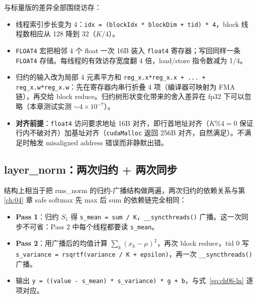 与标量版的差异全部围绕访存：
\begin{itemize}
  \item 线程索引步长变为 4：\texttt{idx = (blockIdx * blockDim + tid) * 4}，block 线程数相应从 128 降到 32（$K/4$）。
  \item \texttt{FLOAT4} 宏把相邻 4 个 float 一次 16B 装入 \texttt{float4} 寄存器；写回同样一条 \texttt{FLOAT4} 存储。每线程的有效访存宽度翻 4 倍，load/store 指令数减为 1/4。
  \item 归约的输入改为局部 4 元素平方和 \texttt{reg\_\allowbreak{}x.\allowbreak{}x*reg\_\allowbreak{}x.\allowbreak{}x + .\allowbreak{}.\allowbreak{}.\allowbreak{} + reg\_\allowbreak{}x.\allowbreak{}w*reg\_\allowbreak{}x.\allowbreak{}w}：先在寄存器内串行折叠 4 项（编译器可映射为 FMA 链），再交给 block reduce。归约树形状变化带来的舍入差异在 fp32 下可以忽略（本章测试实测 $\sim 4 \times 10^{-7}$）。
  \item \textbf{对齐前提}：\texttt{float4} 访问要求地址 16B 对齐，即行首地址对齐（$K \% 4 = 0$ 保证行内不破对齐）加基址对齐（\texttt{cudaMalloc} 返回 256B 对齐，自然满足）。不满足时触发 misaligned address 错误而非静默出错。
\end{itemize}

\subsection{layer\_norm：两次归约 + 两次同步}



结构上相当于把 rms\_norm 的归约-广播结构做两遍，两次归约的依赖关系与第 \ref{ch:04} 章 safe softmax 先 max 后 sum 的依赖链完全相同：
\begin{itemize}
  \item \textbf{Pass 1}：归约 $S_1$ 得 \texttt{s\_mean = sum / K}，\texttt{\_\allowbreak{}\_\allowbreak{}syncthreads\allowbreak{}()} 广播。这一次同步不可省：Pass 2 中每个线程都要读 \texttt{s\_mean}。
  \item \textbf{Pass 2}：用广播后的均值计算 $\sum_k (x_k - \mu)^2$，再次 block reduce，tid 0 写 \texttt{s\_\allowbreak{}variance =\allowbreak{} rsqrtf\allowbreak{}(variance /\allowbreak{} K + epsilon)}，再一次 \texttt{\_\allowbreak{}\_\allowbreak{}syncthreads\allowbreak{}()} 广播。
  \item 输出 \texttt{y = ((value - s\_mean) * s\_variance) * g + b}，与式~\eqref{eq:ch06-ln} 逐项对应。
\end{itemize}

